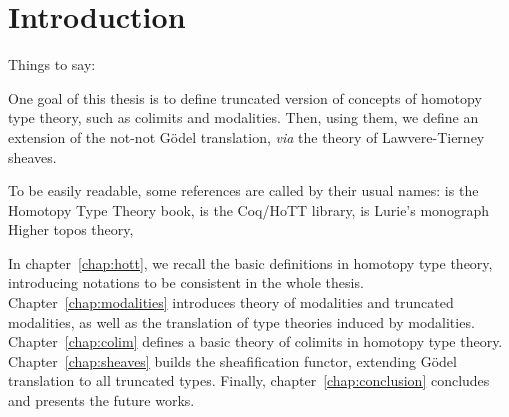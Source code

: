 \chapter{Introduction}
\label{chap:intro}


Things to say:

One goal of this thesis is to define truncated version of concepts of
homotopy type theory, such as colimits and modalities. Then, using
them, we define an extension of the not-not Gödel translation, {\em
  via} the theory of Lawvere-Tierney sheaves.

To be easily readable, some references are called by their usual
names: \cite{hottbook} is the Homotopy Type Theory book,
\cite{hottlib} is the Coq/HoTT library, \cite{lurie} is Lurie's
monograph Higher topos theory, \etc 

In chapter~\ref{chap:hott}, we recall the basic definitions in
homotopy type theory, introducing notations to be consistent in the
whole thesis. Chapter~\ref{chap:modalities} introduces theory of
modalities and truncated modalities, as well as the translation of
type theories induced by modalities. Chapter~\ref{chap:colim} defines
a basic theory of colimits in homotopy type
theory. Chapter~\ref{chap:sheaves} builds the sheafification functor,
extending Gödel translation to all truncated types. Finally,
chapter~\ref{chap:conclusion} concludes and presents the future works.
